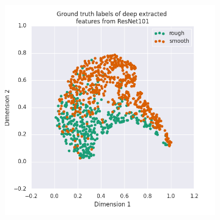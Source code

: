 \documentclass{aci}
\numberwithin{equation}{section}
\begin{document}



\begin{figure}[h]
    \centering
    \begin{subfigure}{.45\textwidth}
        \includegraphics[width=1\linewidth]{thesis_assets/plots/resnet101_gt_tsne.png}
    \end{subfigure}
    \begin{subfigure}{.45\textwidth}

\end{subfigure}
\end{figure}
\end{document}
